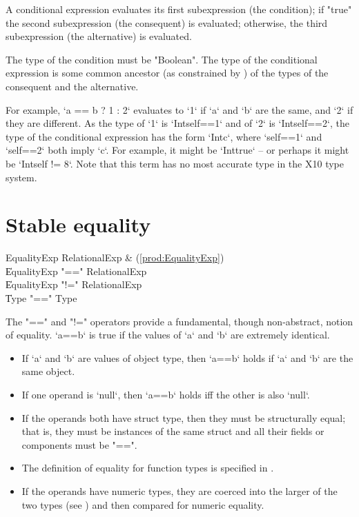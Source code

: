 A conditional expression evaluates its first subexpression (the
condition); if \xcd"true"
the second subexpression (the consequent) is evaluated; otherwise,
the third subexpression (the alternative) is evaluated.

The type of the condition must be \xcd"Boolean".
The type of the conditional expression is some common 
ancestor (as constrained by ) of the types of the consequent and the
alternative. 

For example, 
\xcd`a == b ? 1 : 2`
evaluates to \xcd`1` if \xcd`a` and \xcd`b` are the same, and \xcd`2` if they
are different.   As the type of \xcd`1` is \xcd`Int{self==1}` and of \xcd`2`
is \xcd`Int{self==2}`, the type of the conditional expression has the form
\xcd`Int{c}`, where \xcd`self==1` and \xcd`self==2` both imply \xcd`c`.  For
example, it might be \xcd`Int{true}` -- or perhaps it might be 
\xcd`Int{self != 8}`. Note that this term has no most accurate type in the X10
type system.

\section{Stable equality}
\label{StableEquality}
\index{\Xcd{==}}

\begin{bbgrammar}
 EqualityExp    \: RelationalExp & (\ref{prod:EqualityExp})\\%
    \| EqualityExp \xcd"==" RelationalExp\\
    \| EqualityExp \xcd"!=" RelationalExp\\
    \| Type  \xcd"==" Type \\
\end{bbgrammar}


The \xcd"==" and \xcd"!=" operators provide a fundamental, though
non-abstract, notion of equality.  \xcd`a==b` is true if the values of \xcd`a`
and \xcd`b` are extremely identical.

\begin{itemize}
\item If \xcd`a` and \xcd`b` are values of object type, then \xcd`a==b` holds
      if \xcd`a` and \xcd`b` are the same object.
\item If one operand is \xcd`null`, then \xcd`a==b` holds iff the other is
      also \xcd`null`.
\item If the operands both have struct type, then they must be structurally equal;
that is, they must be instances of the same struct
and all their fields or components must be \xcd"==". 
\item The definition of equality for function types is specified in
      .
\item If the operands have numeric types, they are coerced into the larger of
      the two types (see ) and then compared for numeric equality.
\end{itemize}

